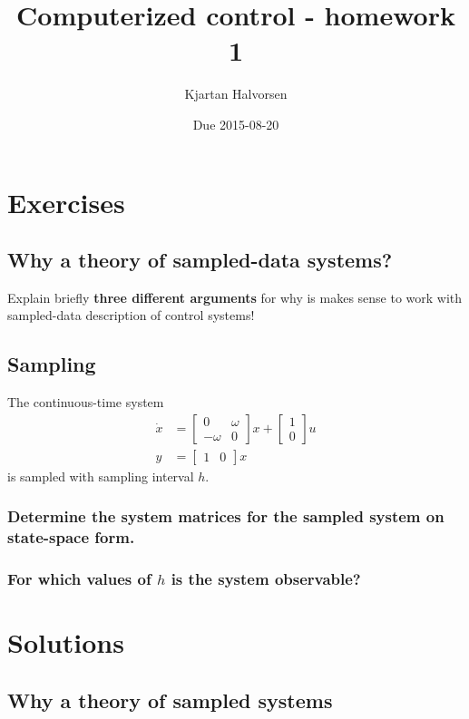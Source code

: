 \documentclass{scrartcl}
\title{Computerized control - homework 1}
\author{Kjartan Halvorsen}
\date{Due 2015-08-20}
\begin{document}
\maketitle



\section{Exercises}
\label{sec-1}
\subsection{Why a theory of sampled-data systems?}
\label{sec-1-1}

   Explain briefly \textbf{three different arguments} for why is makes sense to work with sampled-data description of control systems!
\subsection{Sampling}
\label{sec-1-2}

The continuous-time system
\begin{align*}
\dot{x} &= \begin{bmatrix} 0 & \omega\\-\omega & 0 \end{bmatrix} x + \begin{bmatrix}1\\0\end{bmatrix} u\\
y &= \begin{bmatrix} 1 & 0 \end{bmatrix} x
\end{align*} 
is sampled with sampling interval $h$. 
\subsubsection{Determine the system matrices for the sampled system on state-space form.}
\label{sec-1-2-1}
\subsubsection{For which values of $h$ is the system observable?}
\label{sec-1-2-2}
\section{Solutions}
\label{sec-2}
\subsection{Why a theory of sampled systems}
\label{sec-2-1}
\end{document}
